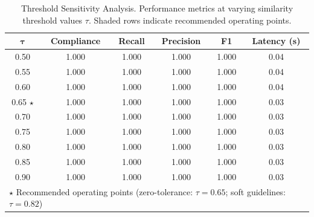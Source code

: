 \begin{table}[H]
\caption{Threshold Sensitivity Analysis. Performance metrics at varying similarity
threshold values $\tau$. Shaded rows indicate recommended operating points.
\label{tab:sensitivity}}
\begin{tabular}{cccccc}
\toprule
$\boldsymbol{\tau}$ & \textbf{Compliance} & \textbf{Recall} & \textbf{Precision} & \textbf{F1} & \textbf{Latency (s)} \\
\midrule
0.50 & 1.000 & 1.000 & 1.000 & 1.000 & 0.04 \\
0.55 & 1.000 & 1.000 & 1.000 & 1.000 & 0.04 \\
0.60 & 1.000 & 1.000 & 1.000 & 1.000 & 0.04 \\
0.65 $\star$ & 1.000 & 1.000 & 1.000 & 1.000 & 0.03 \\
0.70 & 1.000 & 1.000 & 1.000 & 1.000 & 0.03 \\
0.75 & 1.000 & 1.000 & 1.000 & 1.000 & 0.03 \\
0.80 & 1.000 & 1.000 & 1.000 & 1.000 & 0.03 \\
0.85 & 1.000 & 1.000 & 1.000 & 1.000 & 0.03 \\
0.90 & 1.000 & 1.000 & 1.000 & 1.000 & 0.03 \\
\midrule
\multicolumn{6}{l}{\small $\star$ Recommended operating points (zero-tolerance: $\tau=0.65$; soft guidelines: $\tau=0.82$)} \\
\bottomrule
\end{tabular}
\end{table}